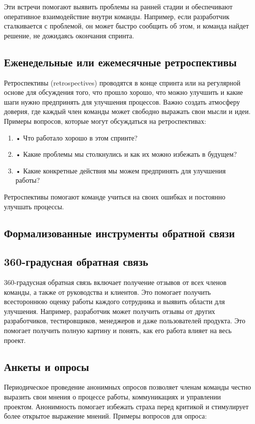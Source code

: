     Эти встречи помогают выявить проблемы на ранней стадии и обеспечивают оперативное взаимодействие внутри команды. Например, если разработчик сталкивается с проблемой, он может быстро сообщить об этом, и команда найдет решение, не дожидаясь окончания спринта.

    \subsection*{Еженедельные или ежемесячные ретроспективы}
    Ретроспективы (retrospectives) проводятся в конце спринта или на регулярной основе для обсуждения того, что прошло хорошо, что можно улучшить и какие шаги нужно предпринять для улучшения процессов. Важно создать атмосферу доверия, где каждый член команды может свободно выражать свои мысли и идеи. Примеры вопросов, которые могут обсуждаться на ретроспективах:

    \begin{enumerate}
        \item •	Что работало хорошо в этом спринте?
        \item •	Какие проблемы мы столкнулись и как их можно избежать в будущем?
        \item •	Какие конкретные действия мы можем предпринять для улучшения работы?
    \end{enumerate}
    
    Ретроспективы помогают команде учиться на своих ошибках и постоянно улучшать процессы.

    \subsection{Формализованные инструменты обратной связи}

    \subsection*{360-градусная обратная связь}
    360-градусная обратная связь включает получение отзывов от всех членов команды, а также от руководства и клиентов. Это помогает получить всестороннюю оценку работы каждого сотрудника и выявить области для улучшения. Например, разработчик может получить отзывы от других разработчиков, тестировщиков, менеджеров и даже пользователей продукта. Это помогает получить полную картину и понять, как его работа влияет на весь проект.

    \subsection*{Анкеты и опросы}
    Периодическое проведение анонимных опросов позволяет членам команды честно выразить свои мнения о процессе работы, коммуникациях и управлении проектом. Анонимность помогает избежать страха перед критикой и стимулирует более открытое выражение мнений. Примеры вопросов для опроса:
    
